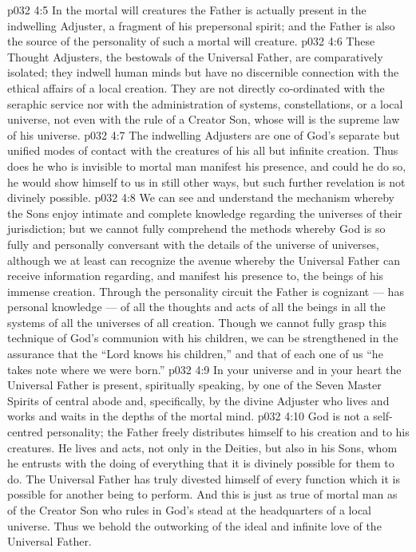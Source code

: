 \vs p032 4:5 \pc In the mortal will creatures the Father is actually present in the indwelling Adjuster, a fragment of his prepersonal spirit; and the Father is also the source of the personality of such a mortal will creature.
\vs p032 4:6 \pc These Thought Adjusters, the bestowals of the Universal Father, are comparatively isolated; they indwell human minds but have no discernible connection with the ethical affairs of a local creation. They are not directly co\hyp{}ordinated with the seraphic service nor with the administration of systems, constellations, or a local universe, not even with the rule of a Creator Son, whose will is the supreme law of his universe.
\vs p032 4:7 The indwelling Adjusters are one of God’s separate but unified modes of contact with the creatures of his all but infinite creation. Thus does he who is invisible to mortal man manifest his presence, and could he do so, he would show himself to us in still other ways, but such further revelation is not divinely possible.
\vs p032 4:8 We can see and understand the mechanism whereby the Sons enjoy intimate and complete knowledge regarding the universes of their jurisdiction; but we cannot fully comprehend the methods whereby God is so fully and personally conversant with the details of the universe of universes, although we at least can recognize the avenue whereby the Universal Father can receive information regarding, and manifest his presence to, the beings of his immense creation. Through the personality circuit the Father is cognizant --- has personal knowledge --- of all the thoughts and acts of all the beings in all the systems of all the universes of all creation. Though we cannot fully grasp this technique of God’s communion with his children, we can be strengthened in the assurance that the “Lord knows his children,” and that of each one of us “he takes note where we were born.”
\vs p032 4:9 \pc In your universe and in your heart the Universal Father is present, spiritually speaking, by one of the Seven Master Spirits of central abode and, specifically, by the divine Adjuster who lives and works and waits in the depths of the mortal mind.
\vs p032 4:10 \pc God is not a self\hyp{}centred personality; the Father freely distributes himself to his creation and to his creatures. He lives and acts, not only in the Deities, but also in his Sons, whom he entrusts with the doing of everything that it is divinely possible for them to do. The Universal Father has truly divested himself of every function which it is possible for another being to perform. And this is just as true of mortal man as of the Creator Son who rules in God’s stead at the headquarters of a local universe. Thus we behold the outworking of the ideal and infinite love of the Universal Father.

